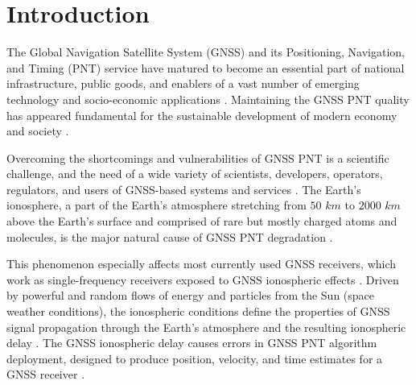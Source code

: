 \documentclass[sn-mathphys-num]{sn-jnl}%
\begin{document}



\maketitle

\section{Introduction}

The Global Navigation Satellite System (GNSS) and its Positioning, Navigation, and Timing (PNT) service have matured to become an essential part of national infrastructure, public goods, and enablers of a vast number of emerging technology and socio-economic applications \cite{filjar2022application}. Maintaining the GNSS PNT quality has appeared fundamental for the sustainable development of modern economy and society \cite{filjar2022application}. 

Overcoming the shortcomings and vulnerabilities of GNSS PNT is a scientific challenge, and the need of a wide variety of scientists, developers, operators, regulators, and users of GNSS-based systems and services \cite{filjar2024ambient, filjar2022application}. The Earth’s ionosphere, a part of the Earth’s atmosphere stretching from $50$ $km$ to $2000$ $km$ above the Earth’s surface and comprised of rare but mostly charged atoms and molecules, is the major natural cause of GNSS PNT degradation \cite{davies1990ionospheric, filic2018modelling}. 

This phenomenon especially affects most currently used GNSS receivers, which work as single-frequency receivers exposed to GNSS ionospheric effects \cite{spilker1996global, filjar2022application}. Driven by powerful and random flows of energy and particles from the Sun (space weather conditions), the ionospheric conditions define the properties of GNSS signal propagation through the Earth’s atmosphere and the resulting ionospheric delay \cite{davies1990ionospheric, oxley2017uncertainties, filic2018modelling}. The GNSS ionospheric delay causes errors in GNSS PNT algorithm deployment, designed to produce position, velocity, and time estimates for a GNSS receiver \cite{spilker1996global, filic2018modelling}. 
\end{document}
